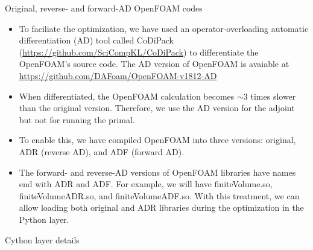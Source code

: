 \documentclass{bredelebeamer}
\begin{document}
\begin{frame}[fragile]{Original, reverse- and forward-AD OpenFOAM codes}

\begin{itemize}
  \setlength\itemsep{0.5em}
\item To faciliate the optimization, we have used an operator-overloading automatic differentiation (AD) tool called CoDiPack (\url{https://github.com/SciCompKL/CoDiPack}) to differentiate the OpenFOAM's source code. The AD version of OpenFOAM is avaiable at \url{https://github.com/DAFoam/OpenFOAM-v1812-AD}

\item When differentiated, the OpenFOAM calculation becomes $\sim$3 times slower than the original version. Therefore, we use the AD version for the adjoint but not for running the primal.

\item To enable this, we have compiled OpenFOAM into three versions: original, ADR (reverse AD), and ADF (forward AD).

\item The forward- and reverse-AD versions of OpenFOAM libraries have names end with ADR and ADF. For example, we will have finiteVolume.so, finiteVolumeADR.so, and finiteVolumeADF.so. With this treatment, we can allow loading both original and ADR libraries during the optimization in the Python layer.

\end{itemize}


\end{frame}


\begin{frame}{}
  \center \Large Cython layer details
\end{frame}
\end{document}
